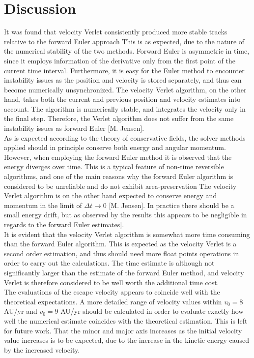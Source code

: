 \documentclass[%
reprint,nofootinbib,
amsmath,amssymb,
aps,
]{revtex4-1}
\begin{document}
\section{Discussion} \noindent 
It was found that velocity Verlet consistently produced more stable tracks relative to the forward Euler approach This is as expected, due to the nature of the numerical stability of the two methods. Forward Euler is asymmetric in time, since it employs information of the derivative only from the first point of the current time interval. Furthermore, it is easy for the Euler method to encounter instability issues as the position and velocity is stored separately, and thus can become numerically unsynchronized. The velocity Verlet algorithm, on the other hand, takes both the current and previous position and velocity estimates into account. The algorithm is numerically stable, and integrates the velocity only in the final step. Therefore, the Verlet algorithm does not suffer from the same instability issues as forward Euler [M. Jensen].\\ \indent 
As is expected according to the theory of conservative fields, the solver methods applied should in principle conserve both energy and angular momentum. However, when employing the forward Euler method it is observed that the energy diverges over time. This is a typical feature of non-time reversible algorithms, and one of the main reasons why the forward Euler algorithm is considered to be unreliable and do not exhibit area-preservation The velocity Verlet algorithm is on the other hand expected to conserve energy and momentum in the limit of $\Delta t \rightarrow 0$ [M. Jensen]. In practice there should be a small energy drift, but as observed by the results this appears to be negligible in regards to the forward Euler estimates]. \\ \indent 
It is evident that the velocity Verlet algorithm is somewhat more time consuming than the forward Euler algorithm. This is expected as the velocity Verlet is a second order estimation, and thus should need more float points operations in order to carry out the calculations. The time estimate is although not significantly larger than the estimate of the forward Euler method, and velocity Verlet is therefore considered to be well worth the additional time cost. \\ \indent 
The evaluations of the escape velocity appears to coincide well with the theoretical expectations. A more detailed range of velocity values within $v_0 = 8$ AU/yr and $v_0 = 9$ AU/yr should be calculated in order to evaluate exactly how well the numerical estimate coincides with the theoretical estimation. This is left for future work. That the minor and major axis increases as the initial velocity value increases is to be expected, due to the increase in the kinetic energy caused by the increased velocity.\\ \newpage
\end{document}
